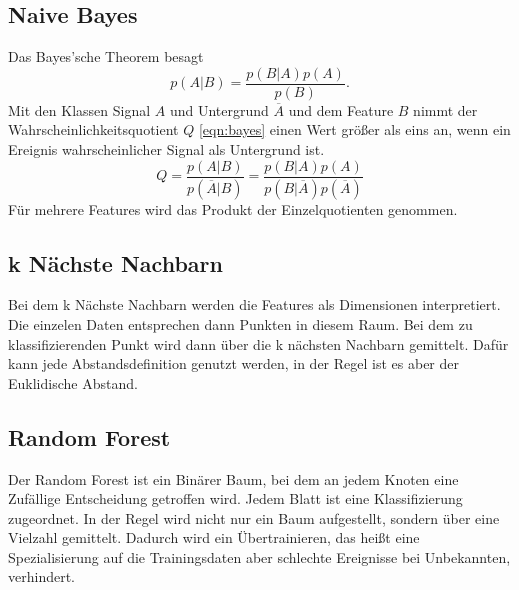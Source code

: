 \subsection{Naive Bayes}
Das Bayes'sche Theorem besagt
\begin{equation}
	p(A|B)=\frac{p(B|A)p(A)}{p(B)}.
\end{equation}
Mit den Klassen Signal $A$ und Untergrund $\overline{A}$ und dem Feature $B$ nimmt der Wahrscheinlichkeitsquotient $Q$ \eqref{eqn:bayes} einen Wert größer als
eins an, wenn ein Ereignis wahrscheinlicher Signal als Untergrund ist.
\begin{equation}
	Q=\frac{p(A|B)}{p(\overline{A}|B)} = \frac{p(B|A)p(A)}{p(B|\overline{A})p(\overline{A})}
	\label{eqn:bayes}
\end{equation}
Für mehrere Features wird das Produkt der Einzelquotienten genommen.
\subsection{k Nächste Nachbarn}
Bei dem k Nächste Nachbarn werden die Features als Dimensionen interpretiert. Die einzelen Daten entsprechen dann Punkten in diesem Raum. Bei dem zu
klassifizierenden Punkt wird dann über die k nächsten Nachbarn gemittelt. Dafür kann jede Abstandsdefinition genutzt werden, in der Regel ist es aber der
Euklidische Abstand.
\subsection{Random Forest}
Der Random Forest ist ein Binärer Baum, bei dem an jedem Knoten eine Zufällige Entscheidung getroffen wird. Jedem Blatt ist eine Klassifizierung zugeordnet.
In der Regel wird nicht nur ein Baum aufgestellt, sondern über eine Vielzahl gemittelt. Dadurch wird ein Übertrainieren, das heißt eine Spezialisierung auf die
Trainingsdaten aber schlechte Ereignisse bei Unbekannten, verhindert.
